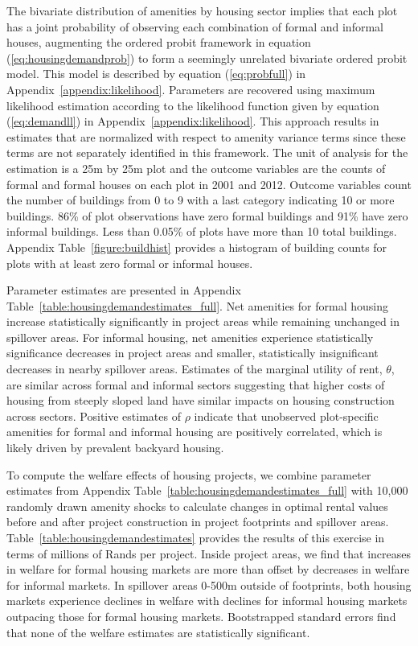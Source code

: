 \documentclass[12pt]{article}
\begin{document}
The bivariate distribution of amenities by housing sector implies that each plot has a joint probability of observing each combination of formal and informal houses, augmenting the ordered probit framework in equation (\ref{eq:housingdemandprob}) to form a seemingly unrelated bivariate ordered probit model.  This model is described by equation (\ref{eq:probfull}) in Appendix~\ref{appendix:likelihood}.  Parameters are recovered using maximum likelihood estimation according to the likelihood function given by equation (\ref{eq:demandll}) in Appendix~\ref{appendix:likelihood}.  This approach results in estimates that are normalized with respect to amenity variance terms since these terms are not separately identified in this framework.  The unit of analysis for the estimation is a 25m by 25m plot and the outcome variables are the counts of formal and formal houses on each plot in 2001 and 2012.  Outcome variables count the number of buildings from 0 to 9 with a last category indicating 10 or more buildings.  86\% of plot observations have zero formal buildings and 91\% have zero informal buildings.  Less than 0.05\% of plots have more than 10 total buildings.  Appendix Table~\ref{figure:buildhist} provides a histogram of building counts for plots with at least zero formal or informal houses.  

Parameter estimates are presented in Appendix Table~\ref{table:housingdemandestimates_full}.  Net amenities for formal housing increase statistically significantly in project areas while remaining unchanged in spillover areas.  For informal housing, net amenities experience statistically significance decreases in project areas and smaller, statistically insignificant decreases in nearby spillover areas.  Estimates of the marginal utility of rent, $\theta$, are similar across formal and informal sectors suggesting that higher costs of housing from steeply sloped land have similar impacts on housing construction across sectors.  Positive estimates of $\rho$ indicate that unobserved plot-specific amenities for formal and informal housing are positively correlated, which is likely driven by prevalent backyard housing.  

To compute the welfare effects of housing projects, we combine parameter estimates from Appendix Table~\ref{table:housingdemandestimates_full} with 10,000 randomly drawn amenity shocks to calculate changes in optimal rental values before and after project construction in project footprints and spillover areas.  Table~\ref{table:housingdemandestimates} provides the results of this exercise in terms of millions of Rands per project.  Inside project areas, we find that increases in welfare for formal housing markets are more than offset by decreases in welfare for informal markets.  In spillover areas 0-500m outside of footprints, both housing markets experience declines in welfare with declines for informal housing markets outpacing those for formal housing markets.  Bootstrapped standard errors find that none of the welfare estimates are statistically significant.  
\end{document}
